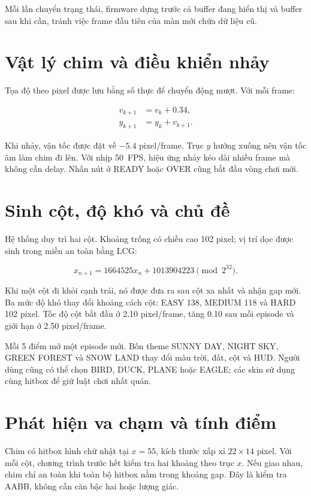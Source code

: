 Mỗi lần chuyển trạng thái, firmware dựng trước cả buffer đang hiển thị và buffer sau khi cần, tránh việc frame đầu tiên của màn mới chứa dữ liệu cũ.

\section{Vật lý chim và điều khiển nhảy}

Tọa độ theo pixel được lưu bằng số thực để chuyển động mượt. Với mỗi frame:

\begin{align}
v_{k+1} &= v_k + 0.34,\\
y_{k+1} &= y_k + v_{k+1}.
\end{align}

Khi nhảy, vận tốc được đặt về $-5.4$ pixel/frame. Trục $y$ hướng xuống nên vận tốc âm làm chim đi lên. Với nhịp \SI{50}{FPS}, hiệu ứng nhảy kéo dài nhiều frame mà không cần delay. Nhấn nút ở READY hoặc OVER cũng bắt đầu vòng chơi mới.

\section{Sinh cột, độ khó và chủ đề}

Hệ thống duy trì hai cột. Khoảng trống có chiều cao 102 pixel; vị trí dọc được sinh trong miền an toàn bằng LCG:

\begin{equation}
x_{n+1}=1664525x_n+1013904223\pmod{2^{32}}.
\end{equation}

Khi một cột đi khỏi cạnh trái, nó được đưa ra sau cột xa nhất và nhận gap mới. Ba mức độ khó thay đổi khoảng cách cột: EASY 138, MEDIUM 118 và HARD 102 pixel. Tốc độ cột bắt đầu ở 2.10 pixel/frame, tăng 0.10 sau mỗi episode và giới hạn ở 2.50 pixel/frame.

Mỗi 5 điểm mở một episode mới. Bốn theme SUNNY DAY, NIGHT SKY, GREEN FOREST và SNOW LAND thay đổi màu trời, đất, cột và HUD. Người dùng cũng có thể chọn BIRD, DUCK, PLANE hoặc EAGLE; các skin sử dụng cùng hitbox để giữ luật chơi nhất quán.

\section{Phát hiện va chạm và tính điểm}

Chim có hitbox hình chữ nhật tại $x=55$, kích thước xấp xỉ $22\times14$ pixel. Với mỗi cột, chương trình trước hết kiểm tra hai khoảng theo trục $x$. Nếu giao nhau, chim chỉ an toàn khi toàn bộ hitbox nằm trong khoảng gap. Đây là kiểm tra AABB, không cần căn bậc hai hoặc lượng giác.

